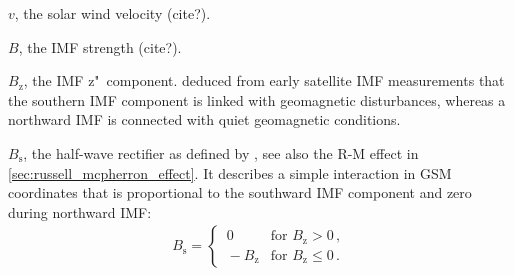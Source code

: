 \begin{itemize*}
	\item $v$, the solar wind velocity (cite?).
	
	\item $B$, the IMF strength (cite?).
	
	\item $B_\text{z}$, the IMF z"~component. \citet{Fairfield1966} deduced from early satellite IMF measurements that the southern IMF component is linked with geomagnetic disturbances, whereas a northward IMF is connected with quiet geomagnetic conditions.
	
	\item $B_\text{s}$, the half-wave rectifier as defined by \citet{Russell1973}, see also the R-M effect in \autoref{sec:russell_mcpherron_effect}. It describes a simple interaction in GSM coordinates that is proportional to the southward IMF component and zero during northward IMF:
	\begin{align}
		B_\text{s} =
		\begin{cases}
			\,0 &\text{for } B_\text{z} > 0	\,,\\
			\,-B_\text{z} &\text{for } B_\text{z} \le 0	\,.
		\end{cases}	\label{eq:half_wave_rectifier}
	\end{align}
	

\end{itemize*}
